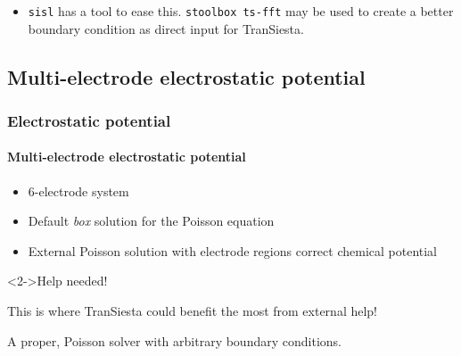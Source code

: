 \begin{frame}
\begin{block}
\begin{itemize}
\begin{itemize}[<+->]
        \item \texttt{sisl} has a tool to ease this. \texttt{stoolbox ts-fft} may be used to
        create a better boundary condition as direct input for TranSiesta.

      \end{itemize}
    \end{itemize}
    
  \end{block}
  
\end{frame}


\subsection{Multi-electrode electrostatic potential}

\begin{frame}
  \frametitle{Electrostatic potential}
  \framesubtitle{Multi-electrode electrostatic potential}

  \begin{itemize}
    \item 6-electrode system
    \item Default \emph{box} solution for the Poisson equation
    \item External Poisson solution with electrode regions correct chemical potential
  \end{itemize}

  \begin{center}
  \end{center}

  \begin{block}<2->{Help needed!}

    This is where TranSiesta could benefit the most from external help!

    A proper, Poisson solver with arbitrary boundary conditions.
    
  \end{block}
  
\end{frame}

